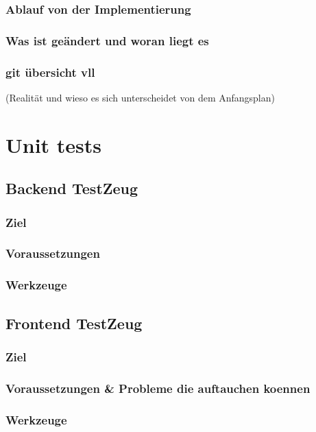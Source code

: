 \documentclass[parskip=full,11pt,twoside]{scrartcl}
\begin{document}
\subsubsection{Ablauf von der Implementierung}
\subsubsection{Was ist geändert und woran liegt es}
\subsubsection{git übersicht vll}
 (Realität und wieso es sich unterscheidet von dem Anfangsplan)
\pagebreak

\section{Unit tests}
\subsection{Backend TestZeug}
\subsubsection{Ziel}
\subsubsection{Voraussetzungen}
\subsubsection{Werkzeuge}
\subsection{Frontend TestZeug}
\subsubsection{Ziel}
\subsubsection{Voraussetzungen \& Probleme die auftauchen koennen}
\subsubsection{Werkzeuge}
\pagebreak
\end{document}
